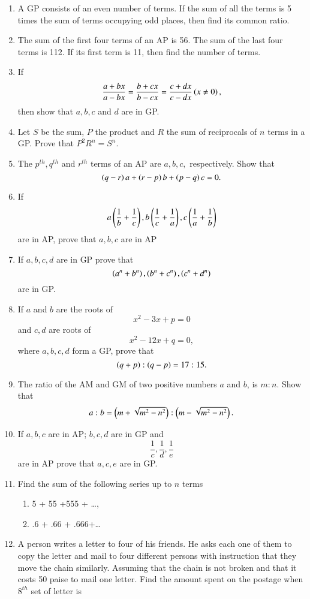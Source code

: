 \begin{enumerate}[label=\thesubsection.\arabic*.,ref=\thesubsection.\theenumi]
\item A GP  consists of an even number of terms. If the sum of all the terms is 5 times the sum of terms occupying odd places, then find its common ratio.
\item  The sum of the first four terms of an AP  is 56. The sum of the last four terms is 112. If its first term is 11, then find the number of terms.
\item If $$\frac{a+bx}{a-bx} = \frac{b+cx}{b-cx} = \frac{c+dx}{c-dx}\left(x \neq 0\right),$$ then show that $a, b, c$ and $d$ are in GP.
\item Let $S$ be the sum, $P$ the product and $R$ the sum of reciprocals of $n$ terms in a GP.  Prove that $P^2R^n = S^n.$ 
\item The $p^{th}, q^{th}$ and $r^{th}$ terms of an AP  are $a, b, c,$ respectively. Show that 
$$\left(q - r \right)a + \left(r - p \right)b + \left(p - q \right)c = 0.$$
\item If $$a\left(\frac{1}{b}+\frac{1}{c}\right), b\left(\frac{1}{c}+\frac{1}{a}\right), c\left(\frac{1}{a}+\frac{1}{b}\right)$$ are in AP, prove that $a, b, c$ are in AP 
\item If $a, b, c, d$ are in GP  prove that $$\left(a^n + b^n\right), \left(b^n + c^n\right), \left(c^n + d^n\right)$$ are in GP. 
\item If $a$ and $b$ are the roots of $$x^2 - 3x + p = 0$$ and $c, d$ are roots of $$x^2 - 12x + q = 0,$$ where $a, b, c, d$ form a GP,  prove that $$\left(q + p\right) : \left(q - p\right) = 17:15.$$
\item The ratio of the AM  and GM  of two positive numbers $a$ and $b$, is $m : n$. Show that 
$$a:b = \left(m+\sqrt{m^2 - n^2}\right):\left(m - \sqrt{m^2 - n^2}\right).$$
\item If $a, b, c$ are in AP; $b, c, d$ are in GP  and $$\frac{1}{c}, \frac{1}{d}, \frac{1}{e}$$ are in AP  prove that $a, c, e$ are in GP.
\item Find the sum of the following series up to $n$ terms
\begin{enumerate}
\item 5 + 55 +555 + \dots, 
\item .6 + .66 + .666+\dots 
\end{enumerate}
\item A person writes a letter to four of his friends. He asks each one of them to copy
the letter and mail to four different persons with instruction that they move the
chain similarly. Assuming that the chain is not broken and that it costs 50 paise to
mail one letter. Find the amount spent on the postage when $8^{th}$ set of letter is

\end{enumerate}
